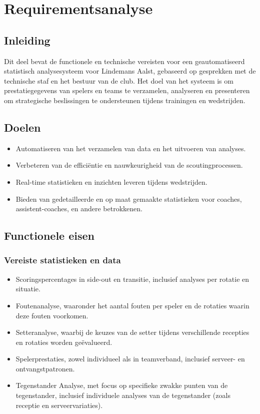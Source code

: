 \section{Requirementsanalyse}
\label{ch:requirementsanalyse}

\subsection{Inleiding}
Dit deel bevat de functionele en technische vereisten voor een geautomatiseerd statistisch analysesysteem voor Lindemans Aalst, gebaseerd op gesprekken met de technische staf en het bestuur van de club. Het doel van het systeem is om prestatiegegevens van spelers en teams te verzamelen, analyseren en presenteren om strategische beslissingen te ondersteunen tijdens trainingen en wedstrijden.

\subsection{Doelen}
\begin{itemize}
  \item Automatiseren van het verzamelen van data en het uitvoeren van analyses.
  \item Verbeteren van de efficiëntie en nauwkeurigheid van de scoutingprocessen.
  \item Real-time statistieken en inzichten leveren tijdens wedstrijden.
  \item Bieden van gedetailleerde en op maat gemaakte statistieken voor coaches, assistent-coaches, en andere betrokkenen.
\end{itemize}

\subsection{Functionele eisen}
\subsubsection{Vereiste statistieken en data}
\begin{itemize}
  \item Scoringspercentages in side-out en transitie, inclusief analyses per rotatie en situatie.
  \item Foutenanalyse, waaronder het aantal fouten per speler en de rotaties waarin deze fouten voorkomen.
  \item Setteranalyse, waarbij de keuzes van de setter tijdens verschillende recepties en rotaties worden geëvalueerd.
  \item Spelerprestaties, zowel individueel als in teamverband, inclusief serveer- en ontvangstpatronen.
  \item Tegenstander Analyse, met focus op specifieke zwakke punten van de tegenstander, inclusief individuele analyses van de tegenstander (zoals receptie en serveervariaties).
\end{itemize}

